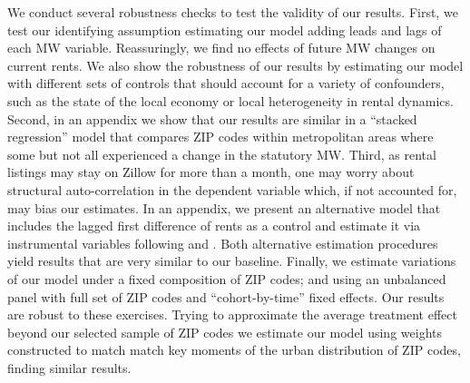 We conduct several robustness checks to test the validity of our results.
First, we test our identifying assumption estimating our model adding leads and 
lags of each MW variable.
Reassuringly, we find no effects of future MW changes on current rents.
We also show the robustness of our results by estimating our model with 
different sets of controls that should account for a variety of confounders, 
such as the state of the local economy or local heterogeneity in 
rental dynamics.
Second, in an appendix we show that our results are similar in a ``stacked 
regression'' model that compares ZIP codes within metropolitan areas where some 
but not all experienced a change in the statutory MW.
Third, as rental listings may stay on Zillow for more than a month, one may worry 
about structural auto-correlation in the dependent variable which, if not 
accounted for, may bias our estimates.
In an appendix, we present an alternative model that includes the lagged first 
difference of rents as a control and estimate it via instrumental variables
following \textcite{ArellanoBond1991} and \textcite{MeerWest2016}.
Both alternative estimation procedures yield results that are very similar to our 
baseline.
Finally, we estimate variations of our model under a fixed composition of ZIP 
codes; and using an unbalanced panel with full set of ZIP codes and 
``cohort-by-time'' fixed effects.
Our results are robust to these exercises.
Trying to approximate the average treatment effect beyond our selected sample of
ZIP codes we estimate our model using weights constructed to match match key 
moments of the urban distribution of ZIP codes, finding similar results.


